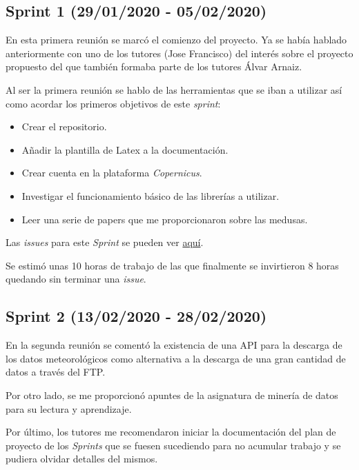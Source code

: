 \subsection{Sprint 1 (29/01/2020 - 05/02/2020)}\label{Sprint-1}
En esta primera reunión se marcó el comienzo del proyecto. Ya se había hablado anteriormente con uno de los tutores (Jose Francisco) del interés sobre el proyecto propuesto del que también formaba parte de los tutores Álvar Arnaiz.

Al ser la primera reunión se hablo de las herramientas que se iban a utilizar así como acordar los primeros objetivos de este \emph{sprint}:

\begin{itemize}
\item Crear el repositorio.
\item Añadir la plantilla de Latex a la documentación.
\item Crear cuenta en la plataforma \emph{Copernicus}.
\item Investigar el funcionamiento básico de las librerías a utilizar.
\item Leer una serie de papers que me proporcionaron sobre las medusas.
\end{itemize}

Las \emph{issues} para este \emph{Sprint} se pueden ver \href{https://github.com/psnti/TFG-Pablo-Santidrian-Tudanca/milestone/1}{aquí}.

Se estimó unas 10 horas de trabajo de las que finalmente se invirtieron 8 horas quedando sin terminar una \emph{issue}.


\subsection{Sprint 2 (13/02/2020 - 28/02/2020)}\label{Sprint-2}

En la segunda reunión se comentó la existencia de una API para la descarga de los datos meteorológicos como alternativa a la descarga de una gran cantidad de datos a través del FTP.

Por otro lado, se me proporcionó apuntes de la asignatura de minería de datos para su lectura y aprendizaje.

Por último, los tutores me recomendaron iniciar la documentación del plan de proyecto de los \emph{Sprints} que se fuesen sucediendo para no acumular trabajo y se pudiera olvidar detalles del mismos.

